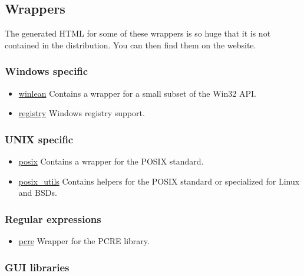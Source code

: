 \hypertarget{wrappers}{%
\subsection{Wrappers}\label{wrappers}}

The generated HTML for some of these wrappers is so huge that it is not
contained in the distribution. You can then find them on the website.

\hypertarget{windows-specific}{%
\subsubsection{Windows specific}\label{windows-specific}}

\begin{itemize}
\tightlist
\item
  \href{winlean.html}{winlean} Contains a wrapper for a small subset of
  the Win32 API.
\item
  \href{registry.html}{registry} Windows registry support.
\end{itemize}

\hypertarget{unix-specific}{%
\subsubsection{UNIX specific}\label{unix-specific}}

\begin{itemize}
\tightlist
\item
  \href{posix.html}{posix} Contains a wrapper for the POSIX standard.
\item
  \href{posix_utils.html}{posix\_utils} Contains helpers for the POSIX
  standard or specialized for Linux and BSDs.
\end{itemize}

\hypertarget{regular-expressions-1}{%
\subsubsection{Regular expressions}\label{regular-expressions-1}}

\begin{itemize}
\tightlist
\item
  \href{pcre.html}{pcre} Wrapper for the PCRE library.
\end{itemize}

\hypertarget{gui-libraries}{%
\subsubsection{GUI libraries}\label{gui-libraries}}

